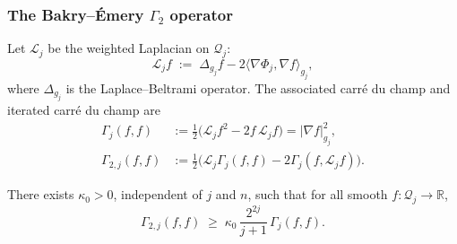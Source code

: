 \subsubsection{The Bakry--\'Emery $\Gamma_{2}$ operator}

Let $\mathcal{L}_{j}$ be the weighted Laplacian on
$\mathcal{Q}_{j}$:
\begin{equation}
\label{eq:weighted_laplacian}
  \mathcal{L}_{j}f
  \;:=\;\Delta_{g_{j}}f-2\langle\nabla\Phi_{j},\nabla f
  \rangle_{g_{j}},
\end{equation}
where $\Delta_{g_{j}}$ is the Laplace--Beltrami operator. The
associated carr\'e du champ and iterated carr\'e du champ are
\begin{align}
\label{eq:carre_du_champ}
  \Gamma_{j}(f,f)&:=\tfrac{1}{2}\bigl(\mathcal{L}_{j}f^{2}
  -2f\,\mathcal{L}_{j}f\bigr)=|\nabla f|_{g_{j}}^{2},\\
\label{eq:carre_du_champ_2}
  \Gamma_{2,j}(f,f)&:=\tfrac{1}{2}\bigl(\mathcal{L}_{j}\Gamma_{j}(f,f)
  -2\Gamma_{j}(f,\mathcal{L}_{j}f)\bigr).
\end{align}

\begin{lemma}
\label{lem:be_curvature}
There exists $\kappa_{0}>0$, independent of $j$ and $n$, such that
for all smooth $f:\mathcal{Q}_{j}\to\mathbb{R}$,
\begin{equation}
\label{eq:be_curvature}
  \Gamma_{2,j}(f,f)\;\ge\;\kappa_{0}\,\frac{2^{2j}}{j+1}\,
  \Gamma_{j}(f,f).
\end{equation}
\end{lemma}

